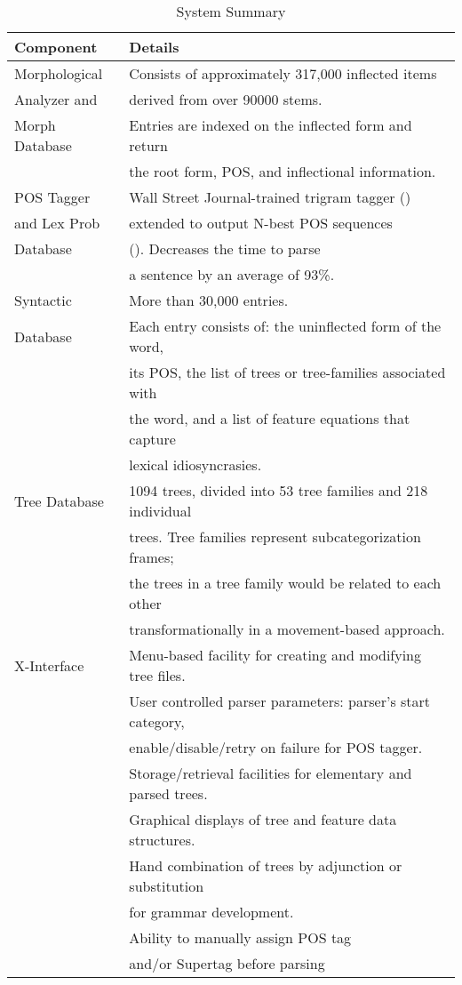 \begin{table}[ht]
\small
\centering
\begin{tabular}{|l|l|} \hline
Component & Details \\ \hline
Morphological & Consists of approximately 317,000 inflected items \\ 
Analyzer and & derived from over 90000 stems. \\ 
Morph Database & Entries are indexed on the inflected form and return \\
& the root form, POS, and inflectional information.\\ \hline
POS Tagger & Wall Street Journal-trained
trigram tagger (\cite{kwc88})  \\ 
and  Lex Prob & extended to output N-best POS sequences  \\
Database & (\cite{soong90}). Decreases the time to parse \\
&a sentence by an average of 93\%. \\\hline
Syntactic &  More than 30,000 entries. \\
Database & Each entry consists of: the uninflected form of the word, \\
& its POS, the list of trees or tree-families associated with \\
& the word, and a list of feature equations that capture \\
&lexical idiosyncrasies. \\ \hline
Tree Database &  1094 trees, divided into 53 tree families and 218 individual \\
& trees. Tree families represent subcategorization frames; \\
& the trees in a tree family would be related to each other \\

& transformationally in a movement-based approach. \\ \hline
X-Interface & Menu-based facility for creating and modifying tree files. \\
&  User controlled parser parameters: parser's start category, \\ 
& enable/disable/retry on failure for POS tagger. \\
& Storage/retrieval facilities for elementary and parsed trees.\\
& Graphical displays of tree and feature data structures. \\
& Hand combination of trees by adjunction or substitution \\
& for grammar development. \\ 
& Ability to manually assign POS tag \\
& and/or Supertag before parsing \\ \hline
\end{tabular}
\caption{System Summary}
\label{sys-table}
\end{table}

